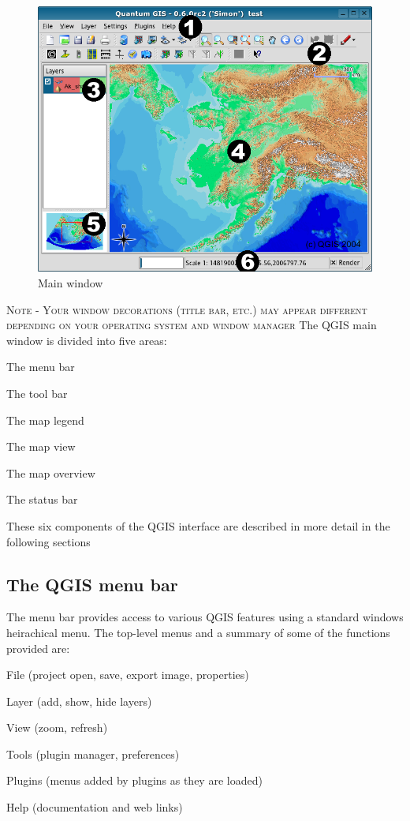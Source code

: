 \begin{figure}[h]
   \begin{center}
   \caption{Main window}\label{fig:startup}
   \includegraphics[scale=.5]{qgis_user_guide_images/startup}
\end{center}  
   
\end{figure}
\textsc{Note - Your window decorations (title bar, etc.) may appear different depending on your operating system and window manager}
The QGIS main window is divided into five areas:
\begin{compactenum}
\item The menu bar
\item The tool bar
\item The map legend
\item The map view
\item The map overview
\item The status bar
\end{compactenum}

These six components of the QGIS interface are described in more detail in the following sections
\subsection{The QGIS menu bar}
The menu bar provides access to various QGIS features using a standard windows
heirachical menu. The top-level menus and a summary of some of the functions provided are:
\begin{compactitem}
\item File (project open, save, export image, properties)
\item Layer (add, show, hide layers)
\item View (zoom, refresh)
\item Tools (plugin manager, preferences)
\item Plugins (menus added by plugins as they are loaded)
\item Help (documentation and web links)
\end{compactitem}

